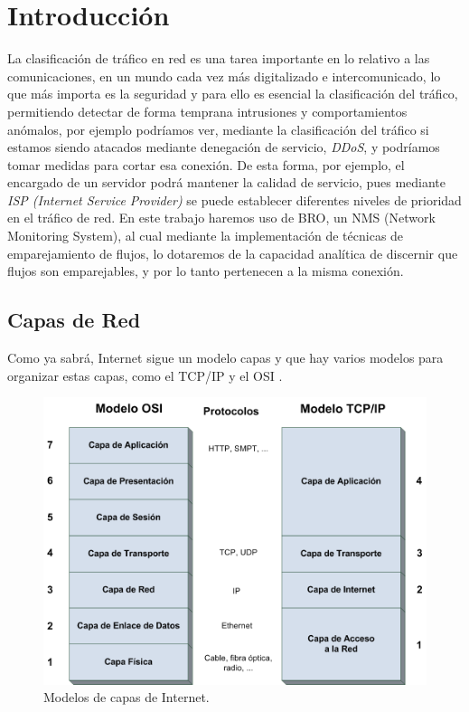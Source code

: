\chapter{Introducción}

La clasificación de tráfico en red es una tarea importante 
en lo relativo a las comunicaciones, en un mundo cada vez 
más digitalizado e intercomunicado, lo que más importa es 
la seguridad y para ello es esencial la clasificación del 
tráfico, permitiendo detectar de forma temprana intrusiones 
y comportamientos anómalos, por ejemplo podríamos ver, mediante 
la clasificación del tráfico si estamos siendo atacados mediante 
denegación de servicio, \textit{DDoS}, y podríamos tomar medidas para cortar esa 
conexión. De esta forma, por ejemplo, el encargado de un 
servidor podrá mantener la calidad de servicio, pues mediante 
\textit{ISP (Internet Service Provider)} se puede establecer diferentes 
niveles de prioridad en el tráfico de red.
\intro
En este trabajo haremos uso de BRO, un NMS (Network Monitoring System), 
al cual mediante la implementación de técnicas de emparejamiento de 
flujos, lo dotaremos de la capacidad analítica de discernir que flujos 
son emparejables, y por lo tanto pertenecen a la misma conexión.

\section{Capas de Red}

Como ya sabrá, Internet sigue un modelo capas y que hay varios modelos para 
organizar estas capas, como el TCP/IP y el OSI \cite{redes2010}.

\begin{figure}[H]
  \includegraphics[width=1\textwidth]{imagenes/capas.png}
  \centering
  \caption{Modelos de capas de Internet.}
\end{figure}

